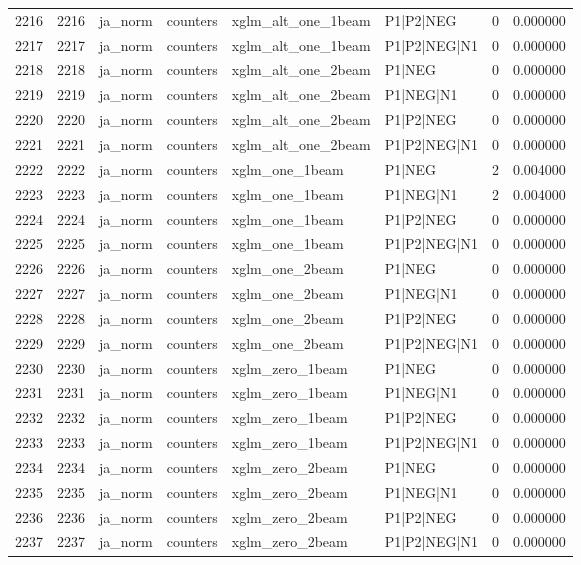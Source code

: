 \begin{tabular}{lrllllrr}
2216 & 2216 & ja_norm & counters & xglm_alt_one_1beam & P1|P2|NEG & 0 & 0.000000 \\
2217 & 2217 & ja_norm & counters & xglm_alt_one_1beam & P1|P2|NEG|N1 & 0 & 0.000000 \\
2218 & 2218 & ja_norm & counters & xglm_alt_one_2beam & P1|NEG & 0 & 0.000000 \\
2219 & 2219 & ja_norm & counters & xglm_alt_one_2beam & P1|NEG|N1 & 0 & 0.000000 \\
2220 & 2220 & ja_norm & counters & xglm_alt_one_2beam & P1|P2|NEG & 0 & 0.000000 \\
2221 & 2221 & ja_norm & counters & xglm_alt_one_2beam & P1|P2|NEG|N1 & 0 & 0.000000 \\
2222 & 2222 & ja_norm & counters & xglm_one_1beam & P1|NEG & 2 & 0.004000 \\
2223 & 2223 & ja_norm & counters & xglm_one_1beam & P1|NEG|N1 & 2 & 0.004000 \\
2224 & 2224 & ja_norm & counters & xglm_one_1beam & P1|P2|NEG & 0 & 0.000000 \\
2225 & 2225 & ja_norm & counters & xglm_one_1beam & P1|P2|NEG|N1 & 0 & 0.000000 \\
2226 & 2226 & ja_norm & counters & xglm_one_2beam & P1|NEG & 0 & 0.000000 \\
2227 & 2227 & ja_norm & counters & xglm_one_2beam & P1|NEG|N1 & 0 & 0.000000 \\
2228 & 2228 & ja_norm & counters & xglm_one_2beam & P1|P2|NEG & 0 & 0.000000 \\
2229 & 2229 & ja_norm & counters & xglm_one_2beam & P1|P2|NEG|N1 & 0 & 0.000000 \\
2230 & 2230 & ja_norm & counters & xglm_zero_1beam & P1|NEG & 0 & 0.000000 \\
2231 & 2231 & ja_norm & counters & xglm_zero_1beam & P1|NEG|N1 & 0 & 0.000000 \\
2232 & 2232 & ja_norm & counters & xglm_zero_1beam & P1|P2|NEG & 0 & 0.000000 \\
2233 & 2233 & ja_norm & counters & xglm_zero_1beam & P1|P2|NEG|N1 & 0 & 0.000000 \\
2234 & 2234 & ja_norm & counters & xglm_zero_2beam & P1|NEG & 0 & 0.000000 \\
2235 & 2235 & ja_norm & counters & xglm_zero_2beam & P1|NEG|N1 & 0 & 0.000000 \\
2236 & 2236 & ja_norm & counters & xglm_zero_2beam & P1|P2|NEG & 0 & 0.000000 \\
2237 & 2237 & ja_norm & counters & xglm_zero_2beam & P1|P2|NEG|N1 & 0 & 0.000000 \\

\end{tabular}
